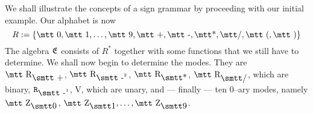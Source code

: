 We shall illustrate the concepts of a sign grammar by proceeding
with our initial example. Our alphabet is now
\begin{equation}
R := \{\mbox{\mtt 0},
\mbox{\mtt 1}, \dotsc, \mbox{\mtt 9}, \mbox{\mtt +}, \mbox{\mtt -}, 
\mbox{\mtt\symbol{42}}, \mbox{\mtt\symbol{47}}, \mbox{\mtt (},
\mbox{\mtt )}\}
\end{equation}
The algebra $\mathfrak{E}$ consists of $R^{\ast}$ together with some functions
that we still have to determine. We shall now begin to determine the
modes. They are $\mbox{\mtt R}_{\mbox{\smtt +}}$, 
$\mbox{\mtt R}_{\mbox{\smtt -}^2}$,
$\mbox{\mtt R}_{\mbox{\smtt\symbol{42}}}$, 
$\mbox{\mtt R}_{\mbox{\smtt\symbol{47}}}$, which are binary,
$\mbox{\tt R}_{\mbox{\smtt -}^1}$, {\mtt V}, which are unary, and
--- finally --- ten 0--ary modes, namely $\mbox{\mtt Z}_{\snull}$, 
$\mbox{\mtt Z}_{\seins}, \dotsc, \mbox{\mtt Z}_{\sneun}$.

